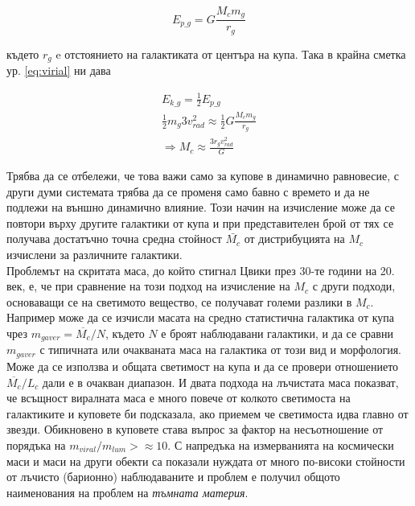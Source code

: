 \documentclass[a4paper,12pt]{article}
\begin{document}
 \begin{equation}
     E_{p\_g}=G \frac{M_c m_g}{r_g} 
 \end{equation}
 
 където $r_g$ e отстоянието на галактиката от центъра на купа. Така в крайна сметка ур. \eqref{eq:virial} ни дава
 
 \begin{gather}
     E_{k\_g}=\frac{1}{2}E_{p\_g}\\
      \frac{1}{2} m_g 3 v_{rad} ^2 \approx \frac{1}{2} G \frac{M_c m_g}{r_g}\\
      \Rightarrow M_c \approx \frac{3 r_g v_{rad}^2}{G}
 \end{gather}

Трябва да се отбележи, че това важи само за купове в динамично равновесие, с други думи системата трябва да се променя само бавно с времето и да не подлежи на външно динамично влияние. Този начин на изчисление може да се повтори върху другите галактики от купа и при представителен брой от тях се получава достатъчно точна средна стойност $\bar{M_c}$ от дистрибуцията на $M_c$ изчислени за различните галактики.\\

Проблемът на скритата маса, до който стигнал Цвики през 30-те години на 20. век, е, че при сравнение на този подход на изчисление на $M_c$ с други подходи, основаващи се на светимото вещество, се получават големи разлики в $M_c$. Например може да се изчисли масата на средно статистична галактика от купа чрез $m_{gaver} = \overline{M_c}/N$, където $N$ е броят наблюдавани галактики, и да се сравни $m_{gaver}$ с типичната или очакваната маса на галактика от този вид и морфология. Може да се използва и общата светимост на купа и да се провери отношението $\overline{M_c}/L_c$ дали е в очакван диапазон. И двата подхода на лъчистата маса показват, че всъщност виралната маса е много повече от колкото светимоста на галактиките и куповете би подсказала, ако приемем че светимоста идва главно от звезди. Обикновено в куповете става въпрос за фактор на несъотношение от порядъка на $m_{viral}/m_{lum} > \approx 10$. С напредъка на измерванията на космически маси и маси на други обекти са показали нуждата от много по-високи стойности от лъчисто (барионно) наблюдаваните и проблем е получил общото наименования на проблем на \textit{тъмната материя}.
\end{document}
